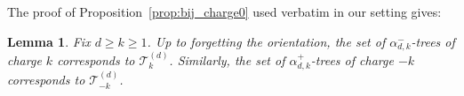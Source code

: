 \documentclass[11pt,reqno,tbtags]{amsart}
\newcommand{\rt}{\mathrm{t}}
\newcommand{\rc}{\mathrm{c}}
\newtheorem{lemm}[theo]{Lemma}
\numberwithin{equation}{section}
\numberwithin{theo}{section}
\theoremstyle{definition}
\newcommand{\cO}{\mathcal{O}}
\newcommand{\out}{\mathrm{deg_{out}}}
\begin{document}
The proof of Proposition~\ref{prop:bij_charge0} used verbatim in our setting gives:

\begin{lemm} \label{lemm:treesk}
Fix $d\geq k\geq 1$. Up to forgetting the orientation, the set of $\alpha_{d,k}^-$-trees of charge $k$ corresponds to $\mathcal{T}_k^{(d)}$. Similarly, the set of $\alpha_{d,k}^+$-trees of charge $-k$ corresponds to $\mathcal{T}_{-k}^{(d)}$.
\end{lemm}


\end{document}

